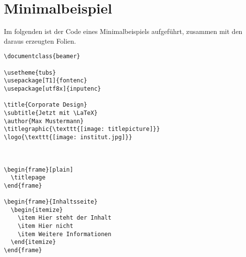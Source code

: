 \section{Minimalbeispiel}%

Im folgenden ist der Code eines Minimalbeispiels aufgeführt, zusammen mit den
daraus erzeugten Folien.

\begin{verbatim}
\documentclass{beamer}

\usetheme{tubs}
\usepackage[T1]{fontenc}
\usepackage[utf8x]{inputenc}

\title{Corporate Design}
\subtitle{Jetzt mit \LaTeX}
\author{Max Mustermann}
\titlegraphic{\texttt{[image: titlepicture]}}
\logo{\texttt{[image: institut.jpg]}}



\begin{frame}[plain]
  \titlepage
\end{frame}

\begin{frame}{Inhaltsseite}
  \begin{itemize}
    \item Hier steht der Inhalt
    \item Hier nicht
    \item Weitere Informationen
  \end{itemize}
\end{frame}


\end{verbatim}

\begin{center}

\end{center}
